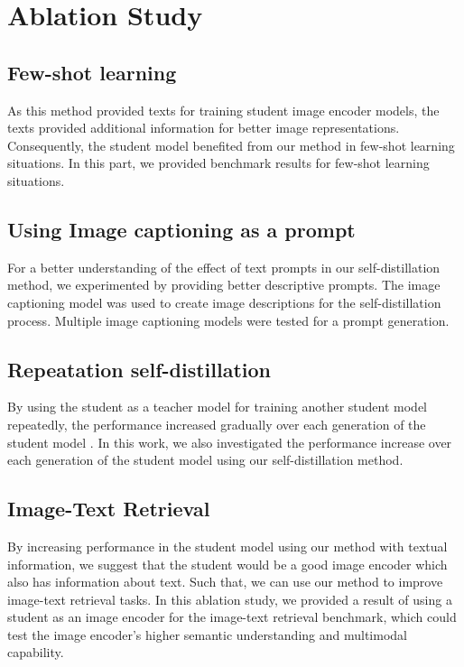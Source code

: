 \section{Ablation Study}
\subsection{Few-shot learning}
As this method provided texts for training student image encoder models, the texts provided additional information for better image representations.
Consequently, the student model benefited from our method in few-shot learning situations.
In this part, we provided benchmark results for few-shot learning situations.

\subsection{Using Image captioning as a prompt}
For a better understanding of the effect of text prompts in our self-distillation method, we experimented by providing better descriptive prompts.
The image captioning model was used to create image descriptions for the self-distillation process.
Multiple image captioning models were tested for a prompt generation.

\subsection{Repeatation self-distillation}
By using the student as a teacher model for training another student model repeatedly, the performance increased gradually over each generation of the student model .
In this work, we also investigated the performance increase over each generation of the student model using our self-distillation method.

\subsection{Image-Text Retrieval}
By increasing performance in the student model using our method with textual information, we suggest that the student would be a good image encoder which also has information about text.
Such that, we can use our method to improve image-text retrieval tasks.
In this ablation study, we provided a result of using a student as an image encoder for the image-text retrieval benchmark, which could test the image encoder's higher semantic understanding and multimodal capability.


